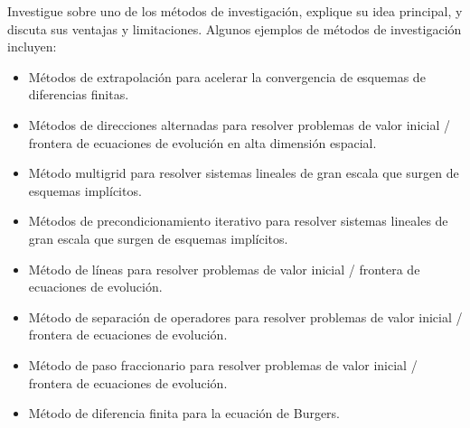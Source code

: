 \begin{questions}
	\question\label{question:research}

	Investigue sobre uno de los métodos de investigación, explique su idea principal, y discuta sus ventajas y limitaciones.
	Algunos ejemplos de métodos de investigación incluyen:
	\begin{itemize}
		\item Métodos de extrapolación para acelerar la convergencia de esquemas de diferencias finitas.
		\item Métodos de direcciones alternadas para resolver problemas de valor inicial / frontera de ecuaciones de evolución en alta dimensión espacial.
		\item Método multigrid para resolver sistemas lineales de gran escala que surgen de esquemas implícitos.
		\item Métodos de precondicionamiento iterativo para resolver sistemas lineales de gran escala que surgen de esquemas implícitos.
		\item Método de líneas para resolver problemas de valor inicial / frontera de ecuaciones de evolución.
		\item Método de separación de operadores para resolver problemas de valor inicial / frontera de ecuaciones de evolución.
		\item Método de paso fraccionario para resolver problemas de valor inicial / frontera de ecuaciones de evolución.
		\item Método de diferencia finita para la ecuación de Burgers.
	\end{itemize}


\end{questions}
